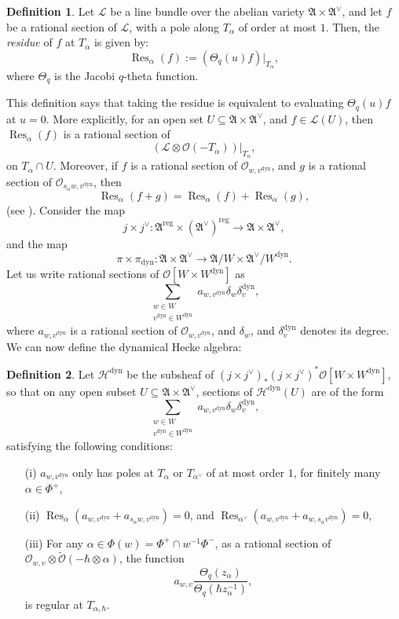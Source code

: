 \documentclass[a4paper]{report}
\theoremstyle{theorem}
\theoremstyle{definition}
\newtheorem{definition}{Definition}
\theoremstyle{remark}
\theoremstyle{proposition}
\theoremstyle{conjecture}
\theoremstyle{lemma}
\theoremstyle{corollary}
\theoremstyle{exercise}
\theoremstyle{example}
\newcommand{\mcal}{\mathcal}
\newcommand{\on}{\operatorname}
\newcommand{\dyn}{{\on{dyn}}}
\begin{document}
  \begin{definition}
      Let $\mcal{L}$ be a line bundle over the abelian variety $\mathfrak{A} \times \mathfrak{A}^\vee$, and
      let $f$ be a rational section of $\mcal{L}$, with a pole along $T_\alpha$ of order at most $1$.
      Then, the \emph{residue} of $f$ at $T_\alpha$ is given by:
      $$\on{Res}_\alpha(f) := \left(\Theta_q(u) f\right)\vert_{T_\alpha},$$
      where $\Theta_q$ is the Jacobi $q$-theta function. 
  \end{definition}
  This definition says that taking the residue is equivalent to evaluating $\Theta_q(u)f$ 
  at $u = 0$. More explicitly, for an open set $U \subseteq \mathfrak{A} \times \mathfrak{A}^\vee$, 
  and $f \in \mcal{L}(U)$, then $\on{Res}_\alpha(f)$ is a rational section of 
  $$\left(\mcal{L} \otimes \mcal{O}(-T_\alpha)\right)\vert_{T_\alpha},$$ 
  on $T_\alpha \cap U$. Moreover, if $f$ is a rational section of $\mcal{O}_{w,v^\dyn}$, and 
  $g$ is a rational section of $\mcal{O}_{s_\alpha w,v^\dyn}$, then 
  $$\on{Res}_\alpha(f+g) = \on{Res}_\alpha(f) + \on{Res}_\alpha(g),$$ 
  (see \cite[Lemma 2.1]{ZZ21}).
  Consider the map
  $$j\times j^\vee : \mathfrak{A}^{\on{reg}} \times (\mathfrak{A}^\vee)^{\on{reg}} \longrightarrow \mathfrak{A} \times \mathfrak{A}^\vee,$$
  and the map $$\pi \times \pi_\dyn : \mathfrak{A} \times \mathfrak{A}^\vee \longrightarrow \mathfrak{A}/W \times \mathfrak{A}^\vee/W^\dyn.$$
  Let us write rational sections of $\mcal{O}[W\times W^\dyn]$ as 
  $$\sum_{\substack{w\in W\\v^\dyn \in W^\dyn}} a_{w,v^\dyn} \delta_w \delta_v^\dyn,$$
  where $a_{w,v^\dyn}$ is a rational section of $\mcal{O}_{w,v^\dyn}$, and 
  $\delta_w$, and $\delta_v^\dyn$ denotes its degree. We can now 
  define the dynamical Hecke algebra:
  
  \begin{definition}
      Let $\mcal{H}^\dyn$ be the subsheaf of $(j\times j^\vee)_\ast(j\times j^\vee)^\ast \mcal{O}[W\times W^\dyn]$, so that on any open subset 
      $U\subseteq \mathfrak{A} \times \mathfrak{A}^\vee$, 
      sections of $\mcal{H}^\dyn(U)$ are of the form $$\sum_{\substack{w\in W\\v^\dyn \in W^\dyn}} a_{w,v^\dyn} \delta_w \delta_v^\dyn,$$
      satisfying the following conditions:
      \begin{itemize}
          \item[(i)] $a_{w,v^\dyn}$ only has poles at $T_\alpha$ or $T_{\alpha^\vee}$ of at most order $1$, for finitely many $\alpha \in \Phi^+$,
          \item[(ii)] $\on{Res}_\alpha(a_{w,v^\dyn} + a_{s_\alpha w,v^\dyn}) = 0$,
              and $\on{Res}_{\alpha^\vee}(a_{w,v^\dyn} + a_{w,s_\alpha v^\dyn}) = 0$,
          \item[(iii)] For any $\alpha \in \Phi(w) = \Phi^+ \cap w^{-1}\Phi^-$, as a rational section
              of $\mcal{O}_{w,v} \otimes \widetilde{\mcal{O}}(-\hbar \otimes \alpha)$, the function 
              $$a_{w,v} \frac{\Theta_q(z_\alpha)}{\Theta_q(\hbar z_\alpha^{-1})},$$
              is regular at $T_{\alpha,\hbar}$.
      \end{itemize}
  \end{definition}
  
\end{document}
